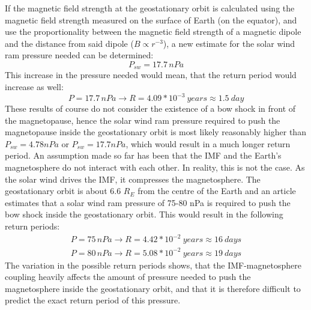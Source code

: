 \documentclass[12pt]{article}
\begin{document}
        If the magnetic field strength at the geostationary orbit is calculated using the magnetic field strength measured on the surface of Earth (on the equator), and use the proportionality between the magnetic field strength of a magnetic dipole and the distance from said dipole ($B\propto r^{-3}$), a new estimate for the solar wind ram pressure needed can be determined:
        \begin{equation}
            P_{sw}=17.7\, nPa
        \end{equation}
        This increase in the pressure needed would mean, that the return period would increase as well:
        \begin{equation}
            P=17.7\, nPa\rightarrow R=4.09*10^{-3}\ years\approx1.5\ day
        \end{equation}
        These results of course do not consider the existence of a bow shock in front of the magnetopause, hence the solar wind ram pressure required to push the magnetopause inside the geostationary orbit is most likely reasonably higher than $P_{sw}=4.78nPa$ or $P_{sw}=17.7nPa$, which would result in a much longer return period. An assumption made so far has been that the IMF and the Earth's magnetosphere do not interact with each other. In reality, this is not the case. As the solar wind drives the IMF, it compresses the magnetosphere. The geostationary orbit is about 6.6 $R_E$ from the centre of the Earth and an article\cite{2004dimitriev} estimates that a solar wind ram pressure of 75-80 nPa is required to push the bow shock inside the geostationary orbit. This would result in the following return periods:
        \begin{equation}
            \begin{split}
                P=75\, nPa\rightarrow R=4.42*10^{-2}\ years\approx16\ days\\
                P=80\, nPa\rightarrow R=5.08*10^{-2}\ years\approx19\ days
            \end{split}
        \end{equation}
        The variation in the possible return periods shows, that the IMF-magnetosphere coupling heavily affects the amount of pressure needed to push the magnetosphere inside the geostationary orbit, and that it is therefore difficult to predict the exact return period of this pressure.
\end{document}
